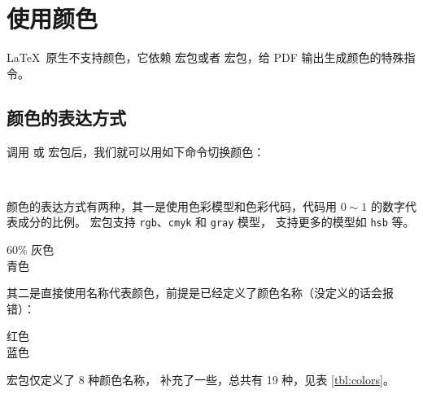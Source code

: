 \section{使用颜色}\label{sec:color}

\LaTeX\ 原生不支持颜色，它依赖  宏包或者  宏包，给 PDF 输出生成颜色的特殊指令。

\subsection{颜色的表达方式}\label{subsec:color-code}

调用  或  宏包后，我们就可以用如下命令切换颜色：
\begin{command}
 \\
\end{command}

颜色的表达方式有两种，其一是使用色彩模型和色彩代码，代码用 $0\sim1$ 的数字代表成分的比例。
 宏包支持 \texttt{rgb}、\texttt{cmyk} 和 \texttt{gray} 模型， 支持更多的模型如 \texttt{hsb} 等。
\begin{example}
\large\sffamily
{\color[gray]{0.6} 
  60\% 灰色} \\
{\color[rgb]{0,1,1} 
  青色} 
\end{example}

其二是直接使用名称代表颜色，前提是已经定义了颜色名称（没定义的话会报错）：
\begin{example}
\large\sffamily
{\color{red} 红色} \\
{\color{blue} 蓝色} 
\end{example}

 宏包仅定义了 8 种颜色名称， 补充了一些，总共有 19 种，见表 \ref{tbl:colors}。

\def\showcolor#1{%
  \texttt{#1}\index{yanse@颜色!#1@\texttt{#1}}%
  \ \begingroup\fboxsep=0pt\fbox{{\color{#1}\vrule width 1.2em height 1.4ex}}\endgroup}
\def\showxcolor#1{%
  \texttt{#1}\index{yanse@颜色!#1@\texttt{#1} (\pkg{xcolor})}%
  \ \begingroup\fboxsep=0pt\fbox{{\color{#1}\vrule width 1.2em height 1.4ex}}\endgroup}

